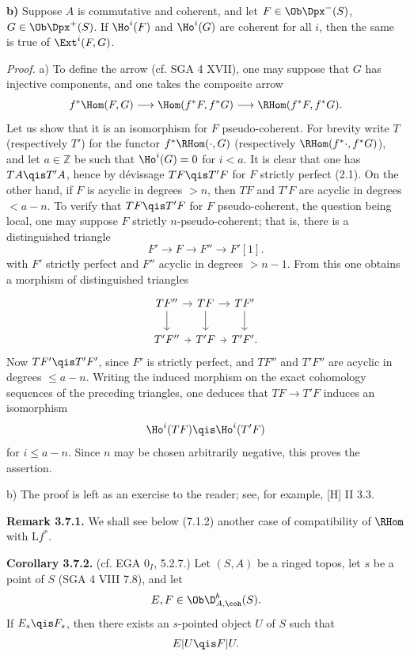 \textbf{b)} Suppose \(A\) is commutative and coherent, and let \(F\in\Ob\Dpx^-(S)\), \(G\in\Ob\Dpx^+(S)\). If \(\Ho^i(F)\) and \(\Ho^i(G)\) are coherent for all \(i\), then the same is true of \(\Ext^i(F,G)\).

\emph{Proof.} a) To define the arrow (cf. SGA 4 XVII), one may suppose that \(G\) has injective components, and one takes the composite arrow
\[
  f^*\Hom(F,G)\longrightarrow \Hom(f^*F,f^*G)
  \longrightarrow \RHom(f^*F,f^*G).
\]
Let us show that it is an isomorphism for \(F\) pseudo-coherent. For brevity write \(T\) (respectively \(T'\)) for the functor \(f^*\RHom(\cdot,G)\) (respectively \(\RHom(f^*\cdot,f^*G)\)), and let \(a\in\mathbb Z\) be such that \(\Ho^i(G)=0\) for \(i<a\). It is clear that one has \(TA\qis T'A\), hence by dévissage \(TF\qis T'F\) for \(F\) strictly perfect (2.1). On the other hand, if \(F\) is acyclic in degrees \(>n\), then \(TF\) and \(T'F\) are acyclic in degrees \(<a-n\). To verify that \(TF\qis T'F\) for \(F\) pseudo-coherent, the question being local, one may suppose \(F\) strictly \(n\)-pseudo-coherent; that is, there is a distinguished triangle
\[
  F'\longrightarrow F\longrightarrow F''\longrightarrow F'[1].
\]
with \(F'\) strictly perfect and \(F''\) acyclic in degrees \(>n-1\). From this one obtains a morphism of distinguished triangles
\[
\begin{tikzcd}[column sep=tiny]
TF'' \arrow[r] \arrow[d] & TF \arrow[r] \arrow[d] & TF' \arrow[d] \\
T'F'' \arrow[r] & T'F \arrow[r] & T'F' .
\end{tikzcd}
\]
Now \(TF'\qis T'F'\), since \(F'\) is strictly perfect, and \(TF''\) and \(T'F''\) are acyclic in degrees \(\leq a-n\). Writing the induced morphism on the exact cohomology sequences of the preceding triangles, one deduces that \(TF\to T'F\) induces an isomorphism
\[
  \Ho^i(TF)\qis \Ho^i(T'F)
\]
for \(i\leq a-n\). Since \(n\) may be chosen arbitrarily negative, this proves the assertion.

b) The proof is left as an exercise to the reader; see, for example, [H] II 3.3.

\textbf{Remark 3.7.1.} We shall see below (7.1.2) another case of compatibility of \(\RHom\) with \(\mathrm L f^*\).

\textbf{Corollary 3.7.2.} (cf. EGA \(0_I\), 5.2.7.) Let \((S,A)\) be a ringed topos, let \(s\) be a point of \(S\) (SGA 4 VIII 7.8), and let
\[
  E,F\in\Ob\D^b_{A,\coh}(S).
\]
If \(E_s\qis F_s\), then there exists an \(s\)-pointed object \(U\) of \(S\) such that
\[
  E|U\qis F|U.
\]

